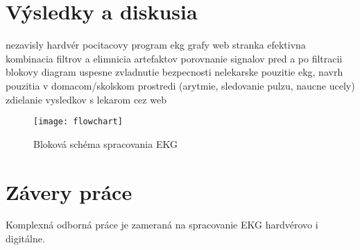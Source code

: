 \documentclass[titlepage,12pt]{article}
\begin{document}
\newpage
\section{Výsledky a diskusia}
nezavisly hardvér
pocitacovy program
ekg grafy
web stranka
efektivna kombinacia filtrov a elimnicia artefaktov
porovnanie signalov pred a po filtracii
blokovy diagram
uspesne zvladnutie bezpecnosti
nelekarske pouzitie ekg, navrh pouzitia v domacom/skolskom prostredi (arytmie, sledovanie pulzu, naucne ucely)
zdielanie vysledkov s lekarom cez web

\begin{figure}[!ht]
\begin{center}
\texttt{[image: flowchart]}
\caption{Bloková schéma spracovania EKG}
\end{center}
\end{figure}


\newpage
\section{Závery práce}
Komplexná odborná práce je zameraná na spracovanie EKG hardvérovo i digitálne.  


\newpage
\end{document}
